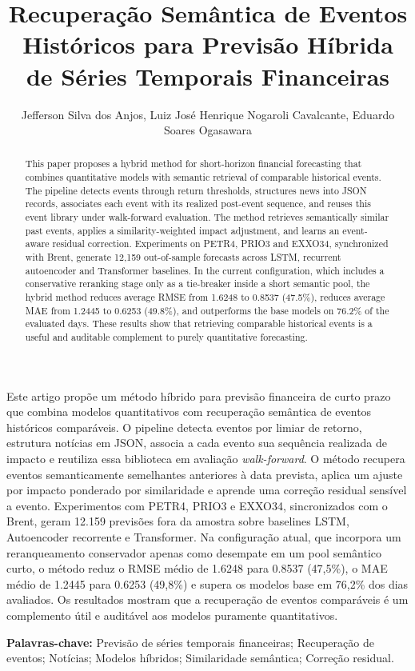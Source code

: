 \documentclass[12pt]{article}
\title{Recuperação Semântica de Eventos Históricos para Previsão Híbrida de Séries Temporais Financeiras}
\author{Jefferson Silva dos Anjos\inst{1}, Luiz José Henrique Nogaroli Cavalcante\inst{2}, Eduardo Soares Ogasawara\inst{3}}
\begin{document}
\maketitle

\begin{resumo}
Este artigo propõe um método híbrido para previsão financeira de curto prazo que combina modelos quantitativos com recuperação semântica de eventos históricos comparáveis. O pipeline detecta eventos por limiar de retorno, estrutura notícias em JSON, associa a cada evento sua sequência realizada de impacto e reutiliza essa biblioteca em avaliação \textit{walk-forward}. O método recupera eventos semanticamente semelhantes anteriores à data prevista, aplica um ajuste por impacto ponderado por similaridade e aprende uma correção residual sensível a evento. Experimentos com PETR4, PRIO3 e EXXO34, sincronizados com o Brent, geram 12.159 previsões fora da amostra sobre baselines LSTM, Autoencoder recorrente e Transformer. Na configuração atual, que incorpora um reranqueamento conservador apenas como desempate em um pool semântico curto, o método reduz o RMSE médio de 1.6248 para 0.8537 (47,5\%), o MAE médio de 1.2445 para 0.6253 (49,8\%) e supera os modelos base em 76,2\% dos dias avaliados. Os resultados mostram que a recuperação de eventos comparáveis é um complemento útil e auditável aos modelos puramente quantitativos.
\end{resumo}

\noindent\textbf{Palavras-chave:} Previsão de séries temporais financeiras; Recuperação de eventos; Notícias; Modelos híbridos; Similaridade semântica; Correção residual.

\begin{abstract}
This paper proposes a hybrid method for short-horizon financial forecasting that combines quantitative models with semantic retrieval of comparable historical events. The pipeline detects events through return thresholds, structures news into JSON records, associates each event with its realized post-event sequence, and reuses this event library under walk-forward evaluation. The method retrieves semantically similar past events, applies a similarity-weighted impact adjustment, and learns an event-aware residual correction. Experiments on PETR4, PRIO3 and EXXO34, synchronized with Brent, generate 12,159 out-of-sample forecasts across LSTM, recurrent autoencoder and Transformer baselines. In the current configuration, which includes a conservative reranking stage only as a tie-breaker inside a short semantic pool, the hybrid method reduces average RMSE from 1.6248 to 0.8537 (47.5\%), reduces average MAE from 1.2445 to 0.6253 (49.8\%), and outperforms the base models on 76.2\% of the evaluated days. These results show that retrieving comparable historical events is a useful and auditable complement to purely quantitative forecasting.
\end{abstract}
\end{document}
